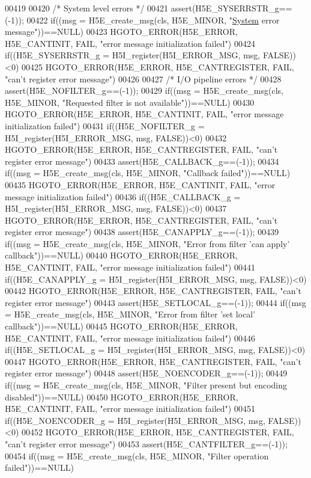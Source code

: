 \begin{DoxyCode}
00419 
00420 \textcolor{comment}{/* System level errors */}
00421 assert(H5E\_SYSERRSTR\_g==(-1));
00422 if((msg = H5E\_create\_msg(cls, H5E\_MINOR, "\hyperlink{namespace_system}{System} error message"))==NULL)
00423     HGOTO\_ERROR(H5E\_ERROR, H5E\_CANTINIT, FAIL, "error message initialization failed")
00424 if((H5E\_SYSERRSTR\_g = H5I\_register(H5I\_ERROR\_MSG, msg, FALSE))<0)
00425     HGOTO\_ERROR(H5E\_ERROR, H5E\_CANTREGISTER, FAIL, "can't register error message")
00426 
00427 \textcolor{comment}{/* I/O pipeline errors */}
00428 assert(H5E\_NOFILTER\_g==(-1));
00429 if((msg = H5E\_create\_msg(cls, H5E\_MINOR, "Requested filter is not available"))==NULL)
00430     HGOTO\_ERROR(H5E\_ERROR, H5E\_CANTINIT, FAIL, "error message initialization failed")
00431 if((H5E\_NOFILTER\_g = H5I\_register(H5I\_ERROR\_MSG, msg, FALSE))<0)
00432     HGOTO\_ERROR(H5E\_ERROR, H5E\_CANTREGISTER, FAIL, "can't register error message")
00433 assert(H5E\_CALLBACK\_g==(-1));
00434 if((msg = H5E\_create\_msg(cls, H5E\_MINOR, "Callback failed"))==NULL)
00435     HGOTO\_ERROR(H5E\_ERROR, H5E\_CANTINIT, FAIL, "error message initialization failed")
00436 if((H5E\_CALLBACK\_g = H5I\_register(H5I\_ERROR\_MSG, msg, FALSE))<0)
00437     HGOTO\_ERROR(H5E\_ERROR, H5E\_CANTREGISTER, FAIL, "can't register error message")
00438 assert(H5E\_CANAPPLY\_g==(-1));
00439 if((msg = H5E\_create\_msg(cls, H5E\_MINOR, "Error from filter 'can apply' callback"))==NULL)
00440     HGOTO\_ERROR(H5E\_ERROR, H5E\_CANTINIT, FAIL, "error message initialization failed")
00441 if((H5E\_CANAPPLY\_g = H5I\_register(H5I\_ERROR\_MSG, msg, FALSE))<0)
00442     HGOTO\_ERROR(H5E\_ERROR, H5E\_CANTREGISTER, FAIL, "can't register error message")
00443 assert(H5E\_SETLOCAL\_g==(-1));
00444 if((msg = H5E\_create\_msg(cls, H5E\_MINOR, "Error from filter 'set local' callback"))==NULL)
00445     HGOTO\_ERROR(H5E\_ERROR, H5E\_CANTINIT, FAIL, "error message initialization failed")
00446 if((H5E\_SETLOCAL\_g = H5I\_register(H5I\_ERROR\_MSG, msg, FALSE))<0)
00447     HGOTO\_ERROR(H5E\_ERROR, H5E\_CANTREGISTER, FAIL, "can't register error message")
00448 assert(H5E\_NOENCODER\_g==(-1));
00449 if((msg = H5E\_create\_msg(cls, H5E\_MINOR, "Filter present but encoding disabled"))==NULL)
00450     HGOTO\_ERROR(H5E\_ERROR, H5E\_CANTINIT, FAIL, "error message initialization failed")
00451 if((H5E\_NOENCODER\_g = H5I\_register(H5I\_ERROR\_MSG, msg, FALSE))<0)
00452     HGOTO\_ERROR(H5E\_ERROR, H5E\_CANTREGISTER, FAIL, "can't register error message")
00453 assert(H5E\_CANTFILTER\_g==(-1));
00454 if((msg = H5E\_create\_msg(cls, H5E\_MINOR, "Filter operation failed"))==NULL)

\end{DoxyCode}
